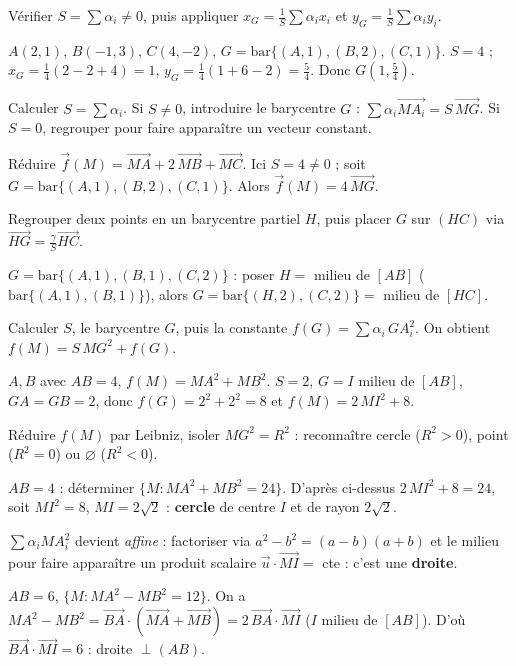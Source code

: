 Vérifier $S=\sum\alpha_i\neq0$, puis appliquer $x_G=\frac1S\sum\alpha_i x_i$ et $y_G=\frac1S\sum\alpha_i y_i$.
\begin{exemple}
$A(2,1)$, $B(-1,3)$, $C(4,-2)$, $G=\mathrm{bar}\{(A,1),(B,2),(C,1)\}$. $S=4$ ;
$x_G=\frac14(2-2+4)=1$, $y_G=\frac14(1+6-2)=\frac54$. Donc $G\!\left(1,\frac54\right)$.
\end{exemple}

Calculer $S=\sum\alpha_i$. Si $S\neq0$, introduire le barycentre $G$ : $\sum\alpha_i\overrightarrow{MA_i}=S\,\overrightarrow{MG}$. Si $S=0$, regrouper pour faire apparaître un vecteur constant.
\begin{exemple}
Réduire $\vec f(M)=\overrightarrow{MA}+2\,\overrightarrow{MB}+\overrightarrow{MC}$. Ici $S=4\neq0$ ; soit $G=\mathrm{bar}\{(A,1),(B,2),(C,1)\}$. Alors $\vec f(M)=4\,\overrightarrow{MG}$.
\end{exemple}

Regrouper deux points en un barycentre partiel $H$, puis placer $G$ sur $(HC)$ via $\overrightarrow{HG}=\frac{\gamma}{S}\overrightarrow{HC}$.
\begin{exemple}
$G=\mathrm{bar}\{(A,1),(B,1),(C,2)\}$ : poser $H=$ milieu de $[AB]$ ($\mathrm{bar}\{(A,1),(B,1)\}$), alors $G=\mathrm{bar}\{(H,2),(C,2)\}=$ milieu de $[HC]$.
\end{exemple}

Calculer $S$, le barycentre $G$, puis la constante $f(G)=\sum\alpha_i\,GA_i^{2}$. On obtient $f(M)=S\,MG^{2}+f(G)$.
\begin{exemple}
$A,B$ avec $AB=4$, $f(M)=MA^{2}+MB^{2}$. $S=2$, $G=I$ milieu de $[AB]$, $GA=GB=2$, donc $f(G)=2^{2}+2^{2}=8$ et $f(M)=2\,MI^{2}+8$.
\end{exemple}

Réduire $f(M)$ par Leibniz, isoler $MG^{2}=R^{2}$ : reconnaître cercle ($R^2>0$), point ($R^2=0$) ou $\varnothing$ ($R^2<0$).
\begin{exemple}
$AB=4$ : déterminer $\{M:MA^{2}+MB^{2}=24\}$. D'après ci-dessus $2\,MI^{2}+8=24$, soit $MI^{2}=8$, $MI=2\sqrt2$ : \textbf{cercle} de centre $I$ et de rayon $2\sqrt2$.
\end{exemple}

$\sum\alpha_i MA_i^2$ devient \emph{affine} : factoriser via $a^2-b^2=(a-b)(a+b)$ et le milieu pour faire apparaître un produit scalaire $\overrightarrow{u}\cdot\overrightarrow{MI}=$ cte : c'est une \textbf{droite}.
\begin{exemple}
$AB=6$, $\{M:MA^2-MB^2=12\}$. On a $MA^2-MB^2=\overrightarrow{BA}\cdot(\overrightarrow{MA}+\overrightarrow{MB})=2\,\overrightarrow{BA}\cdot\overrightarrow{MI}$ ($I$ milieu de $[AB]$). D'où $\overrightarrow{BA}\cdot\overrightarrow{MI}=6$ : droite $\perp(AB)$.
\end{exemple}

